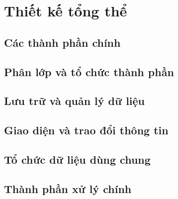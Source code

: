 \par{}
\section{Thiết kế tổng thể}\label{section:architecture-1}

\par{}
\subsection{Các thành phần chính}\label{subsection:architecture-2}

\par{}
\subsection{Phân lớp và tổ chức thành phần}\label{subsection:architecture-3}

\par{}
\subsection{Lưu trữ và quản lý dữ liệu}\label{subsection:architecture-4}

\par{}
\subsection{Giao diện và trao đổi thông tin}\label{subsection:architecture-5}

\par{}
\subsection{Tổ chức dữ liệu dùng chung}\label{subsection:architecture-6}

\par{}
\subsection{Thành phần xử lý chính}\label{subsection:architecture-7}

